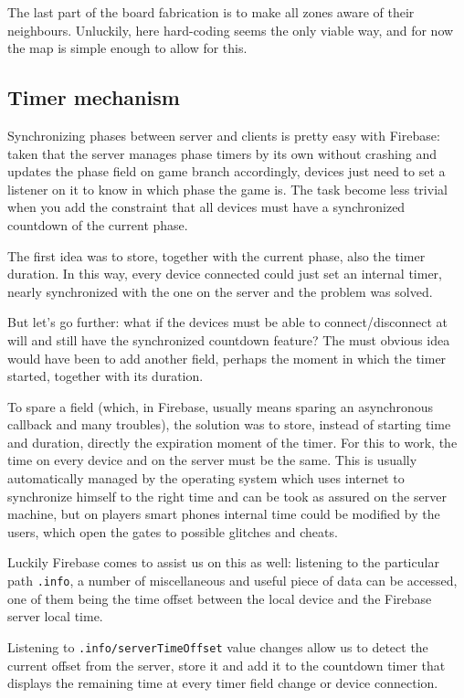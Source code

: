 			The last part of the board fabrication is to make all zones aware of their neighbours. Unluckily, here hard-coding seems the only viable way, and for now the map is simple enough to allow for this.
			
		\subsection{Timer mechanism}\label{focus:timer}
		
			Synchronizing phases between server and clients is pretty easy with Firebase: taken that the server manages phase timers by its own without crashing and updates the phase field on game branch accordingly, devices just need to set a listener on it to know in which phase the game is.
			The task become less trivial when you add the constraint that all devices must have a synchronized countdown of the current phase.
			
			The first idea was to store, together with the current phase, also the timer duration.
			In this way, every device connected could just set an internal timer, nearly synchronized with the one on the server and the problem was solved.
			
			But let's go further: what if the devices must be able to connect/disconnect at will and still have the synchronized countdown feature?
			The must obvious idea would have been to add another field, perhaps the moment in which the timer started, together with its duration.
			
			To spare a field (which, in Firebase, usually means sparing an asynchronous callback and many troubles), the solution was to store, instead of starting time and duration, directly the expiration moment of the timer.
			For this to work, the time on every device and on the server must be the same. This is usually automatically managed by the operating system which uses internet to synchronize himself to the right time and can be took as assured on the server machine, but on players smart phones internal time could be modified by the users, which open the gates to possible glitches and cheats.
			
			Luckily Firebase comes to assist us on this as well: listening to the particular path \lstinline|.info|, a number of miscellaneous and useful piece of data can be accessed, one of them being the time offset between the local device and the Firebase server local time.
			
			Listening to \lstinline|.info/serverTimeOffset| value changes allow us to detect the current offset from the server, store it and add it to the countdown timer that displays the remaining time at every timer field change or device connection.
			
